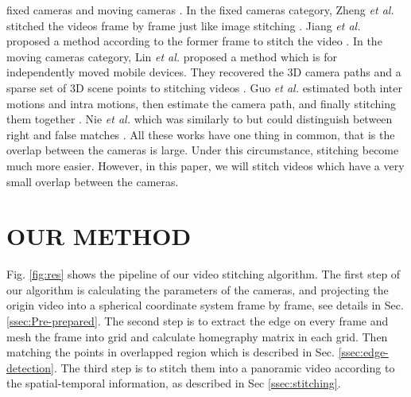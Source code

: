 \documentclass[conference]{IEEEtran}
\begin{document}
fixed cameras \cite{zheng2008stitching, he2010panoramic, Jiang_2015_CVPR_Workshops, perazzi2015panoramic, li2015efficient} 
and moving cameras \cite{lin2016seamless, guo2016joint, nie2018dynamic}. In the fixed cameras category, 
Zheng \textit{et al.} stitched the videos frame by frame just like image stitching \cite{zheng2008stitching}.
Jiang \textit{et al.} proposed a method according to the former frame to stitch the video  \cite{Jiang_2015_CVPR_Workshops}.
In the moving cameras category, 
Lin \textit{et al.} proposed a method which is for independently moved mobile devices.
They recovered the 3D camera paths and a sparse set of 3D scene points to stitching videos \cite{lin2016seamless}.
Guo \textit{et al.} estimated both inter
motions and intra motions, then estimate the camera path, and finally stitching them together \cite{guo2016joint}.
Nie \textit{et al.} which was similarly to \cite{guo2016joint} but could distinguish between right
and false matches \cite{nie2018dynamic}. All these works have one thing in common, that
is the overlap between the cameras is large. Under this circumstance, stitching 
become much more easier. However, in this paper, we will stitch videos
which have a very small overlap between the cameras.

\section{OUR METHOD}
\label{sec:ourmethod}

Fig. \ref{fig:res} shows the pipeline of our video stitching algorithm.
The first step of our algorithm is calculating the parameters of the cameras, and projecting the origin video into a spherical coordinate system frame by frame, 
see details in Sec. \ref{ssec:Pre-prepared}. The second step is to extract the edge on every frame and mesh the frame into grid and calculate homegraphy matrix in each grid. 
Then matching the points in overlapped region which is described in Sec. \ref{ssec:edge-detection}. 
The third step is to stitch them into a panoramic video according to the spatial-temporal information, as described in Sec \ref{ssec:stitching}.
\end{document}

